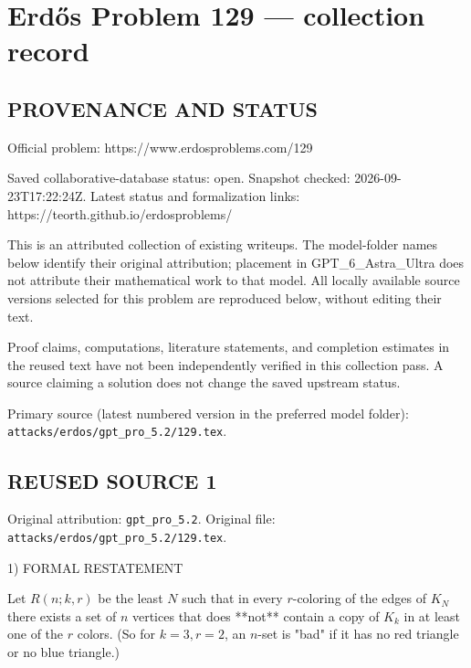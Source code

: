 \section*{Erd\H{o}s Problem 129 --- collection record}

\subsection*{PROVENANCE AND STATUS}
Official problem: https://www.erdosproblems.com/129

Saved collaborative-database status: open.
Snapshot checked: 2026-09-23T17:22:24Z.
Latest status and formalization links: https://teorth.github.io/erdosproblems/

This is an attributed collection of existing writeups. The model-folder names below identify their original attribution; placement in GPT\_6\_Astra\_Ultra does not attribute their mathematical work to that model. All locally available source versions selected for this problem are reproduced below, without editing their text.

Proof claims, computations, literature statements, and completion estimates in the reused text have not been independently verified in this collection pass. A source claiming a solution does not change the saved upstream status.

Primary source (latest numbered version in the preferred model folder): \texttt{attacks/erdos/gpt\_pro\_5.2/129.tex}.

\subsection*{REUSED SOURCE 1}
Original attribution: \texttt{gpt\_pro\_5.2}.
Original file: \texttt{attacks/erdos/gpt\_pro\_5.2/129.tex}.


1) FORMAL RESTATEMENT

Let $R(n;k,r)$ be the least $N$ such that in every $r$-coloring of the edges of $K_N$ there exists a set of $n$ vertices that does **not** contain a copy of $K_k$ in at least one of the $r$ colors.
(So for $k=3,r=2$, an $n$-set is "bad" if it has no red triangle or no blue triangle.)

